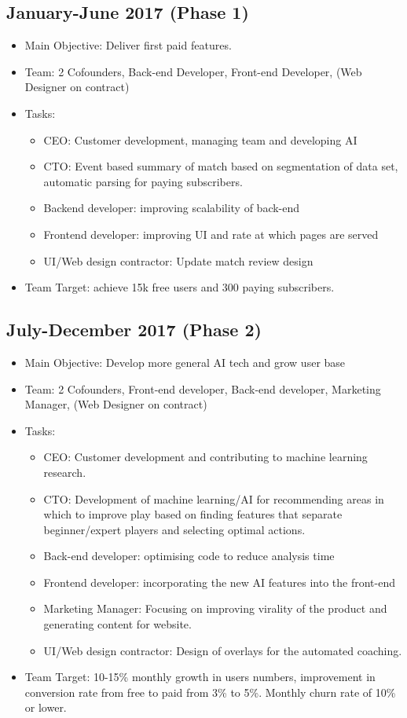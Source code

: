\documentclass[12pt]{article} %
\begin{document}
\subsection[Jan.-June 2017 (Phase 1)]{January-June 2017 (Phase 1)}
\begin{itemize} 
\item Main Objective: Deliver first paid features.
\item Team: 2 Cofounders, Back-end Developer, Front-end Developer, (Web Designer on contract)
\item Tasks:
\begin{itemize} 
\item CEO: Customer development, managing team and developing AI
\item CTO: Event based summary of match based on segmentation of data set, automatic parsing for paying subscribers.
\item Backend developer: improving scalability of back-end
\item Frontend developer: improving UI and rate at which pages are served
\item UI/Web design contractor: Update match review design
\end{itemize}
\item Team Target: achieve 15k free users and 300 paying subscribers.
\end{itemize} 

\subsection[July-Dec. 2017 (Phase 2)]{July-December 2017 (Phase 2)}
\begin{itemize}
\item Main Objective: Develop more general AI tech and grow user base
\item Team: 2 Cofounders, Front-end developer, Back-end developer, Marketing Manager, (Web Designer on contract)
\item Tasks:
\begin{itemize}
\item CEO: Customer development and contributing to machine learning research.
\item CTO: Development of  machine learning/AI for recommending areas in which to improve play based on finding features that separate beginner/expert players and selecting optimal actions. 
\item Back-end developer: optimising code to reduce analysis time
\item Frontend developer: incorporating the new AI features into the front-end
\item Marketing Manager: Focusing on improving virality of the product and generating content for website.
\item UI/Web design contractor: Design of overlays for the automated coaching.
\end{itemize}
\item Team Target: 10-15\% monthly growth in users numbers, improvement in conversion rate from free to paid from 3\% to 5\%. Monthly churn rate of 10\% or lower.
\end{itemize}
\end{document}
